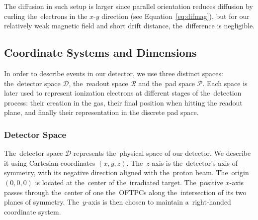 			The diffusion in such setup is larger since parallel orientation reduces diffusion by curling the~electrons in the $x$\nobreakdash-$y$ direction (see Equation~\ref{eq:difmag}), but for our relatively weak magnetic field and short drift distance, the~difference is negligible.
	
		\subsection{Coordinate Systems and Dimensions}
		\label{sec:coor}
			In order to describe events in our detector, we use three distinct spaces: the~detector space $\mathcal{D}$, the~readout space $\mathcal{R}$ and the~pad space $\mathcal{P}$. Each space is later used to represent ionization electrons at different stages of the~detection process: their creation in the gas, their final position when hitting the readout plane, and finally their representation in the discrete pad space.
		
			\subsubsection{Detector Space}
				The~detector space $\mathcal{D}$ represents the~physical space of our detector. We describe it using Cartesian coordinates $(x,y,z)$. The~$z$-axis is the~detector's axis of symmetry, with its negative direction aligned with the~proton beam. The~origin $(0,0,0)$ is located at the~center of the~irradiated target. The~positive $x$\nobreakdash-axis passes through the~center of one the~\acp{OFTPC} along the~intersection of its two planes of symmetry. The~$y$\nobreakdash-axis is then chosen to maintain a~right-handed coordinate system.
				
